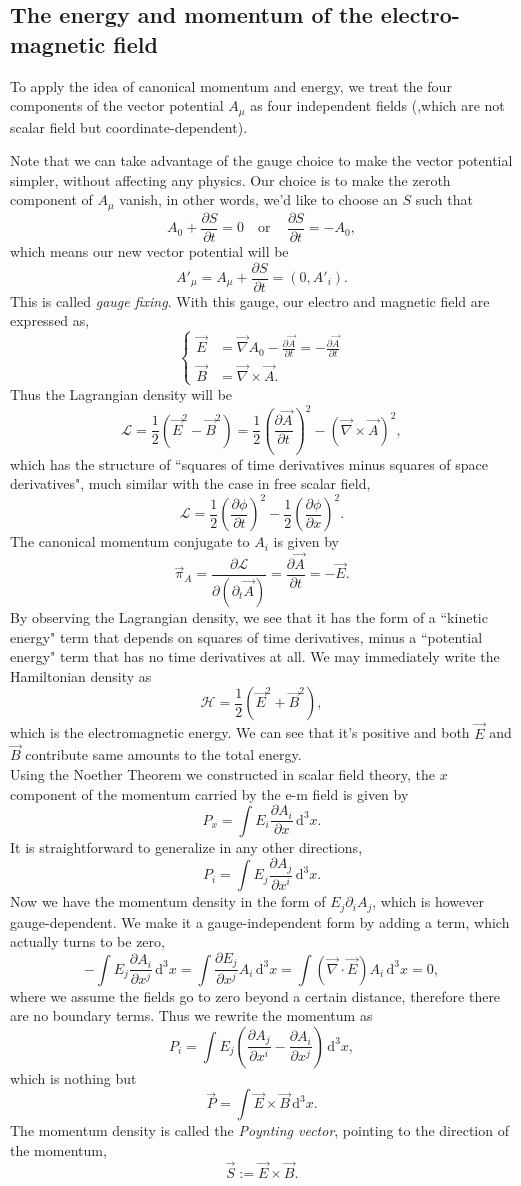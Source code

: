 \documentclass{article}
\newcommand{\be}{\begin{equation}}
\newcommand{\ee}{\end{equation}}
\newcommand{\dif}{\,\mathrm{d}}
\newcommand{\p}{\partial}
\newcommand{\1}{\left}
\newcommand{\2}{\right}
\newcommand{\ma}{\mathcal}
\newcommand{\m}{\mu}
\begin{document}
\subsection{The energy and momentum of the electro-magnetic field}
To apply the idea of canonical momentum and energy, we treat the four components of the vector potential $A_\m$ as four independent fields (,which are not scalar field but coordinate-dependent).

Note that we can take advantage of the gauge choice to make the vector potential simpler, without affecting any physics. Our choice is to make the zeroth component of $A_\m$ vanish, in other words, we'd like to choose an $S$ such that
\be
A_0+\frac{\p S}{\p t}=0 \quad \text{or} \quad\, \frac{\p S}{\p t}=-A_0,
\ee
which means our new vector potential will be
\be
A'_\m=A_\m+\frac{\p S}{\p t} =(0,A'_i).
\ee
This is called \textit{gauge fixing}. With this gauge, our electro and magnetic field are expressed as,
\be\1\{\begin{split}
\vec E&=\vec\nabla A_0-\frac{\p\vec A}{\p t}=-\frac{\p\vec A}{\p t}\\
\vec B&=\vec\nabla\times\vec A.
\end{split}\2.\ee
Thus the Lagrangian density will be
\be
\ma L =\frac1 2 (\vec E^2 - \vec B^2)=\frac1 2  \1(\frac{\p\vec A}{\p t}\2)^2 -  \1(\vec\nabla\times\vec A\2)^2,
\ee
which has the structure of ``squares of time derivatives minus squares of space derivatives", much similar with the case in free scalar field,
\be
\ma L = \frac 1 2 \1(\frac{\p \phi}{\p t}\2)^2 - \frac 1 2\1(\frac{\p \phi}{\p x}\2)^2.
\ee
The canonical momentum conjugate to $A_i$ is given by
\be
\vec \pi_A=\frac{\p\ma L}{\p(\p_t \vec A)}=\frac{\p\vec A}{\p t}=-\vec E.
\ee
By observing the Lagrangian density, we  see that it has the form of a ``kinetic energy" term that depends on squares of time derivatives, minus a ``potential energy" term that has no time derivatives at all. We may immediately write the Hamiltonian density as
\be
\ma H = \frac1 2 (\vec E^2 + \vec B^2),
\ee
which is the electromagnetic energy. We can see that it's positive and both $\vec E$ and $\vec B$ contribute same amounts to the total energy.\\

Using the Noether Theorem we constructed in scalar field theory, the $x$ component of the momentum carried by the e-m field is given by
\be
P_x=\int E_i \frac{\p A_i}{\p x} \dif^3 x.
\ee
It is straightforward to generalize in any other directions,
\be
P_i=\int E_j \frac{\p A_j}{\p x^i} \dif^3 x.
\ee
Now we have the momentum density in the form of $E_j \p_i A_j$, which is however gauge-dependent.
We make it a gauge-independent form by adding a term, which actually turns to be zero,
\be
-\int E_j \frac{\p A_i}{\p x^j} \dif^3 x = \int \frac{\p E_j}{\p x^j} A_i \dif^3 x =\int (\vec\nabla\cdot\vec E) A_i \dif^3 x=0,
\ee
where we assume the fields go to zero beyond a certain distance, therefore there are no boundary terms.
Thus we rewrite the momentum as
\be
P_i=\int E_j \1(\frac{\p A_j}{\p x^i}-\frac{\p A_i}{\p x^j}\2) \dif^3 x,
\ee
which is nothing but
\be
\vec P=\int\vec E\times\vec B \dif^3 x.
\ee
The momentum density is called the \textit{Poynting vector}, pointing to the direction of the momentum,
\be
\vec S:=\vec E\times\vec B.
\ee
\end{document}
